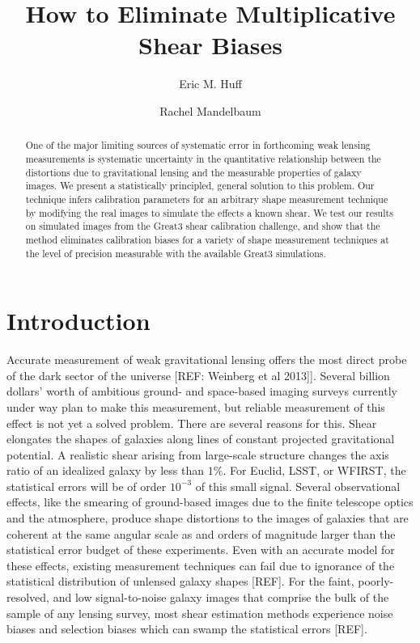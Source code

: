 \documentclass[iop]{emulateapj}
\begin{document}
\title{How to Eliminate Multiplicative Shear Biases}
\author{Eric M. Huff }
\author{Rachel Mandelbaum }



\begin{abstract}
  One of the major limiting sources of systematic error in forthcoming weak lensing measurements is
 systematic uncertainty in the quantitative relationship between the distortions due to gravitational lensing and 
 the measurable properties of galaxy images. We present a statistically principled, general solution to this 
problem. Our technique infers calibration parameters for an arbitrary shape measurement technique by modifying 
the real images to simulate the effects a known shear. We test our results on simulated images from the 
Great3 shear calibration challenge, and show that the method eliminates calibration biases for a variety 
of shape measurement techniques  at the level of precision measurable with the available Great3 simulations.
\end{abstract}


\section{Introduction}
Accurate measurement of weak gravitational lensing offers the most direct probe of the dark sector of the universe [REF: Weinberg et al 2013]]. Several billion dollars' worth of ambitious ground- and space-based imaging surveys currently under way plan to make this measurement, but reliable measurement of this effect is not yet a solved problem. There are several reasons for this.
Shear elongates the shapes of galaxies along lines of constant projected gravitational potential. A realistic shear arising from large-scale structure changes the axis ratio of an idealized galaxy by less than $1\%$. For Euclid, LSST, or WFIRST, the statistical errors will be of order $10^{-3}$ of this small signal. Several observational effects, like the smearing of ground-based images due to the finite telescope optics and the atmosphere, produce shape distortions to the images of galaxies that are coherent at the same angular scale as and orders of magnitude larger than the statistical error budget of these experiments.  Even with an accurate model for these effects, existing measurement techniques can fail due to ignorance of the statistical distribution of unlensed galaxy shapes [REF]. For the faint, poorly-resolved, and low signal-to-noise galaxy images that comprise the bulk of the sample of any lensing survey, most shear estimation methods experience noise biases and selection biases which can swamp the statistical errors [REF].
\end{document}
